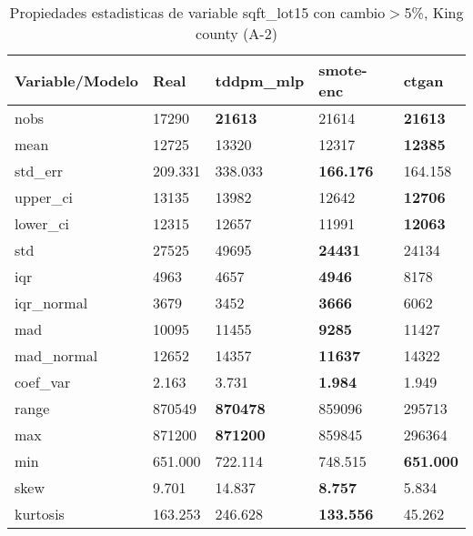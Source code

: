 \begin{table}[H]
\centering
\fontsize{8}{14}\selectfont
\caption{Propiedades estadisticas de variable sqft\_lot15 con cambio\ensuremath{>}5\%, King county (A-2)}
\label{table-stats-king county-a-2-sqft_lot15-short}
\begin{tabular}{|l|m{10em}|m{10em}|m{10em}|m{10em}|}
\hline
 \rowcolor[gray]{0.8}
Variable/Modelo & Real & tddpm\_mlp & smote-enc & ctgan \\
\hline nobs & 17290 & \bfseries 21613 & \cellcolor[rgb]{0.9, 0.54, 0.52} 21614 & \bfseries 21613 \\
\hline mean & 12725 & \cellcolor[rgb]{0.9, 0.54, 0.52} 13320 & 12317 & \bfseries 12385 \\
\hline std\_err & 209.331 & \cellcolor[rgb]{0.9, 0.54, 0.52} 338.033 & \bfseries 166.176 & 164.158 \\
\hline upper\_ci & 13135 & \cellcolor[rgb]{0.9, 0.54, 0.52} 13982 & 12642 & \bfseries 12706 \\
\hline lower\_ci & 12315 & \cellcolor[rgb]{0.9, 0.54, 0.52} 12657 & 11991 & \bfseries 12063 \\
\hline std & 27525 & \cellcolor[rgb]{0.9, 0.54, 0.52} 49695 & \bfseries 24431 & 24134 \\
\hline iqr & 4963 & 4657 & \bfseries 4946 & \cellcolor[rgb]{0.9, 0.54, 0.52} 8178 \\
\hline iqr\_normal & 3679 & 3452 & \bfseries 3666 & \cellcolor[rgb]{0.9, 0.54, 0.52} 6062 \\
\hline mad & 10095 & \cellcolor[rgb]{0.9, 0.54, 0.52} 11455 & \bfseries 9285 & 11427 \\
\hline mad\_normal & 12652 & \cellcolor[rgb]{0.9, 0.54, 0.52} 14357 & \bfseries 11637 & 14322 \\
\hline coef\_var & 2.163 & \cellcolor[rgb]{0.9, 0.54, 0.52} 3.731 & \bfseries 1.984 & 1.949 \\
\hline range & 870549 & \bfseries 870478 & 859096 & \cellcolor[rgb]{0.9, 0.54, 0.52} 295713 \\
\hline max & 871200 & \bfseries 871200 & 859845 & \cellcolor[rgb]{0.9, 0.54, 0.52} 296364 \\
\hline min & 651.000 & 722.114 & \cellcolor[rgb]{0.9, 0.54, 0.52} 748.515 & \bfseries 651.000 \\
\hline skew & 9.701 & \cellcolor[rgb]{0.9, 0.54, 0.52} 14.837 & \bfseries 8.757 & 5.834 \\
\hline kurtosis & 163.253 & 246.628 & \bfseries 133.556 & \cellcolor[rgb]{0.9, 0.54, 0.52} 45.262 \\

\end{tabular}
\end{table}
